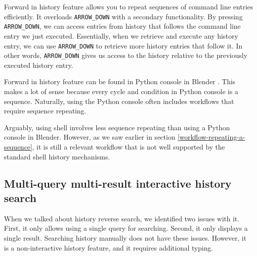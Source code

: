 Forward in history feature allows you to repeat sequences of command line entries efficiently. It overloads \verb|ARROW_DOWN| with a secondary functionality. 
By pressing \verb|ARROW_DOWN|, we can access entries from history that follows the command line entry we just executed. Essentially, when we retrieve and execute any history entry, we can use \verb|ARROW_DOWN| to retrieve more history entries that follow it. In other words, \verb|ARROW_DOWN| gives us access to the history relative to the previously executed history entry.






Forward in history feature can be found in Python console in Blender \cite{tools-blender-docs-python-console}. This makes a lot of sense because every cycle and condition in Python console is a sequence. Naturally, using the Python console often includes workflows that require sequence repeating.

Arguably, using shell involves less sequence repeating than using a Python console in Blender. However, as we saw earlier in section \ref{workflow-repeating-a-sequence}, it is still a relevant workflow that is not well supported by the standard shell history mechanisms. 

\subsection{Multi-query multi-result interactive history search}

When we talked about history reverse search, we identified two issues with it. First, it only allows using a single query for searching. Second, it only displays a single result.
Searching history manually does not have these issues. However, it is a non-interactive history feature, and it requires additional typing. 

